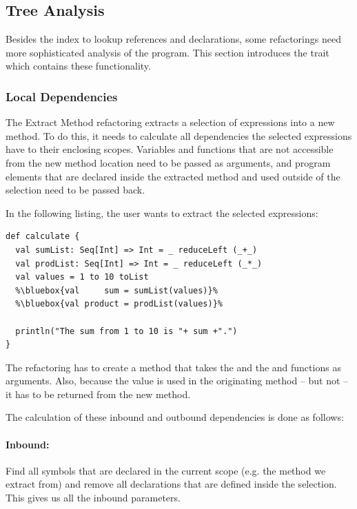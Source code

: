\subsection{Tree Analysis}

Besides the index to lookup references and declarations, some refactorings need more sophisticated analysis of the program. This section introduces the  trait which contains these functionality.

\subsubsection{Local Dependencies}

The Extract Method refactoring extracts a selection of expressions into a new method. To do this, it needs to calculate all dependencies the selected expressions have to their enclosing scopes. Variables and functions that are not accessible from the new method location need to be passed as arguments, and program elements that are declared inside the extracted method and used outside of the selection need to be passed back.

In the following listing, the user wants to extract the selected expressions:

\begin{lstlisting}
def calculate {
  val sumList: Seq[Int] => Int = _ reduceLeft (_+_)
  val prodList: Seq[Int] => Int = _ reduceLeft (_*_)
  val values = 1 to 10 toList
  %\bluebox{val     sum = sumList(values)}%
  %\bluebox{val product = prodList(values)}%

  println("The sum from 1 to 10 is "+ sum +".")
}
\end{lstlisting}

The refactoring has to create a method that takes the  and the  and  functions as arguments. Also, because the  value is used in the originating method -- but not  -- it has to be returned from the new method.

The calculation of these inbound and outbound dependencies is done as follows:

\paragraph{Inbound:} Find all symbols that are declared in the current scope (e.g. the method we extract from) and remove all declarations that are defined inside the selection. This gives us all the inbound parameters.

